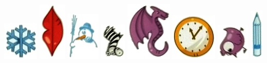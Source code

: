 \documentclass[10pt,a4paper]{article}
\begin{document}
\begin{center}
\includegraphics[scale=0.5]{2.2/card0sign0.jpg}
\includegraphics[scale=0.5]{2.2/card0sign1.jpg}
\includegraphics[scale=0.5]{2.2/card0sign2.jpg}
\includegraphics[scale=0.5]{2.2/card0sign3.jpg}
\includegraphics[scale=0.5]{2.2/card0sign4.jpg}
\includegraphics[scale=0.5]{2.2/card0sign5.jpg}
\includegraphics[scale=0.5]{2.2/card0sign6.jpg}
\includegraphics[scale=0.5]{2.2/card0sign7.jpg}
\end{center}
\end{document}

